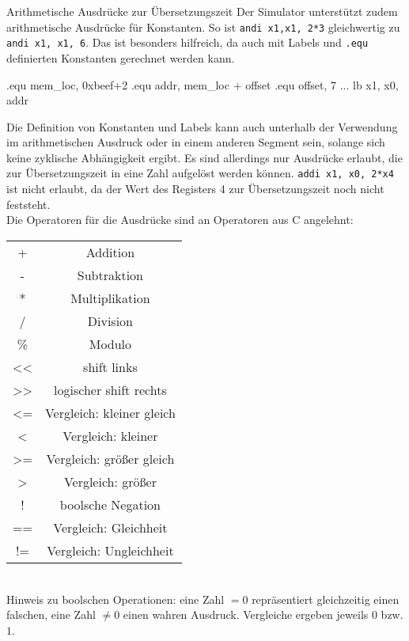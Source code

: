 \begin{infoblock}{Arithmetische Ausdrücke zur Übersetzungszeit}
	Der Simulator unterstützt zudem arithmetische Ausdrücke für Konstanten. So ist \texttt{andi x1,x1, 2*3} gleichwertig zu \texttt{andi x1, x1, 6}. Das ist besonders hilfreich, da auch mit Labels und \texttt{.equ} definierten Konstanten gerechnet werden kann.\\
	\begin{riscv}
		.equ mem_loc, 0xbeef+2
		.equ addr, mem_loc + offset
		.equ offset, 7
		...
		lb x1, x0, addr
	\end{riscv}
	Die Definition von Konstanten und Labels kann auch unterhalb der Verwendung im arithmetischen Ausdruck oder in einem anderen Segment sein, solange sich keine zyklische Abhängigkeit ergibt. Es sind allerdings nur Ausdrücke erlaubt, die zur Übersetzungszeit in eine Zahl aufgelöst werden können. \texttt{addi x1, x0, 2*x4} ist nicht erlaubt, da der Wert des Registers 4 zur Übersetzungszeit noch nicht feststeht.\\
	Die Operatoren für die Ausdrücke sind an Operatoren aus C angelehnt:\\
		\begin{tabular}{|c|c|}
			+ & Addition \\
			- & Subtraktion \\
			* & Multiplikation \\
			/ & Division \\
			\% & Modulo \\
			<< & shift links\\
			>> & logischer shift rechts\\
			<= & Vergleich: kleiner gleich\\
			< & Vergleich: kleiner\\
			>= & Vergleich: größer gleich\\
			> & Vergleich: größer\\
			! & boolsche Negation\\
			== & Vergleich: Gleichheit\\
			!= & Vergleich: Ungleichheit\\
		\end{tabular}\\
	Hinweis zu boolschen Operationen: eine Zahl $=0$ repräsentiert gleichzeitig einen falschen, eine Zahl $\neq 0$ einen wahren Ausdruck. Vergleiche ergeben jeweils $0$ bzw. $1$.
\end{infoblock}

